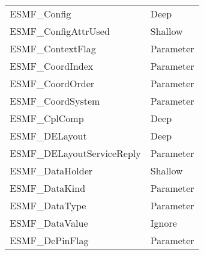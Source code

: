 \begin{table}[t]
\begin{tabular}{ll}
ESMF\_Config                & Deep \\
ESMF\_ConfigAttrUsed        & Shallow\\
ESMF\_ContextFlag           & Parameter \\
ESMF\_CoordIndex            & Parameter \\
ESMF\_CoordOrder            & Parameter \\
ESMF\_CoordSystem           & Parameter \\
ESMF\_CplComp               & Deep \\
ESMF\_DELayout              & Deep \\
ESMF\_DELayoutServiceReply  & Parameter \\
ESMF\_DataHolder            & Shallow\\
ESMF\_DataKind              & Parameter \\
ESMF\_DataType              & Parameter \\
ESMF\_DataValue             & Ignore\\
ESMF\_DePinFlag             & Parameter \\

\end{tabular}
\end{table}



